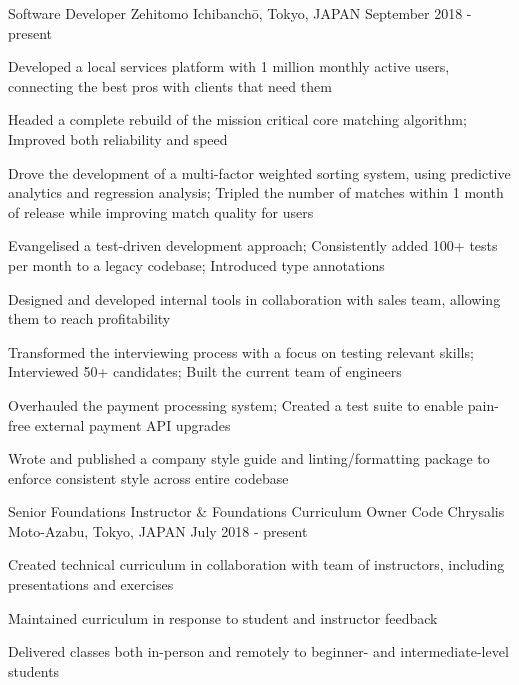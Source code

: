 
\begin{cventries}

  \cventry
  {Software Developer} %
  {Zehitomo} %
  {Ichibanchō, Tokyo, JAPAN} %
  {September 2018 - present} %
  {
    \begin{cvitems} %
      \item {Developed a local services platform with 1 million monthly active users, connecting the best pros with clients that need them}
      \item {Headed a complete rebuild of the mission critical core matching algorithm; Improved both reliability and speed}
      \item {Drove the development of a multi-factor weighted sorting system, using predictive analytics and regression analysis; Tripled the number of matches within 1 month of release while improving match quality for users}
      \item {Evangelised a test-driven development approach; Consistently added 100+ tests per month to a legacy codebase; Introduced type annotations}
      \item {Designed and developed internal tools in collaboration with sales team, allowing them to reach profitability}
      \item {Transformed the interviewing process with a focus on testing relevant skills; Interviewed 50+ candidates; Built the current team of engineers}
      \item {Overhauled the payment processing system; Created a test suite to enable pain-free external payment API upgrades}
      \item {Wrote and published a company style guide and linting/formatting package to enforce consistent style across entire codebase}
    \end{cvitems}
  }

  \cventry
  {Senior Foundations Instructor \& Foundations Curriculum Owner} %
  {Code Chrysalis} %
  {Moto-Azabu, Tokyo, JAPAN} %
  {July 2018 - present} %
  {
    \begin{cvitems} %
      \item {Created technical curriculum in collaboration with team of instructors, including presentations and exercises}
      \item {Maintained curriculum in response to student and instructor feedback}
      \item {Delivered classes both in-person and remotely to beginner- and intermediate-level students}
    \end{cvitems}
  }


\end{cventries}

